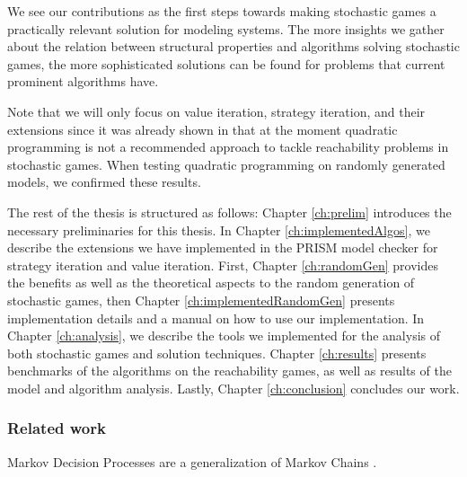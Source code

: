 We see our contributions as the first steps towards making stochastic games a practically relevant solution for modeling systems. 
The more insights we gather about the relation between structural properties and algorithms solving stochastic games, the more sophisticated 
solutions can be found for problems that current prominent algorithms have. 

Note that we will only focus on value iteration, strategy iteration, and their extensions since it was already shown in \cite{gandalf} that at the moment
quadratic programming is not a recommended approach to tackle reachability problems in stochastic games.
When testing quadratic programming on randomly generated models, we confirmed these results.


The rest of the thesis is structured as follows:
Chapter \ref{ch:prelim} introduces the necessary preliminaries for this thesis.
In Chapter \ref{ch:implementedAlgos}, we describe the extensions we have implemented in the PRISM model checker for strategy iteration and value iteration.
First, Chapter \ref{ch:randomGen} provides the benefits as well as the theoretical aspects to the random generation of stochastic games,
then Chapter \ref{ch:implementedRandomGen} presents implementation details and a manual on how to use our implementation.
In Chapter \ref{ch:analysis}, we describe the tools we implemented for the analysis of both stochastic games and solution techniques.
Chapter \ref{ch:results} presents benchmarks of the algorithms on the reachability games, as well as results of the model and algorithm analysis.
Lastly, Chapter \ref{ch:conclusion} concludes our work.

\subsubsection*{Related work}
Markov Decision Processes are a generalization of Markov Chains \cite{Puterman} \cite[Ch.~11]{introProb}.

